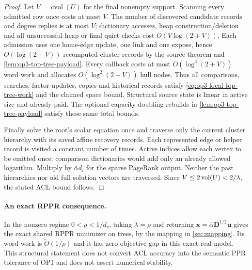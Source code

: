 \begin{proof}
Let $V=\operatorname{cvol}(U)$ for the final nonempty support. Scanning every
admitted row once costs at most $V$. The number of discovered candidate
records and degree replies is at most $V$; dictionary accesses, heap
construction/deletion and all unsuccessful heap or final quiet checks cost
$O(V\log(2+V))$. Each admission uses one home-edge update, one link and one
expose, hence $O(\log(2+V))$ recomputed cluster records by the source theorem
and \cref{lem:op3-top-tree-payload}. Every callback costs at most
$O(\log^3(2+V))$ word work and allocates $O(\log^2(2+V))$ hull nodes.
Thus all comparisons, searches, factor updates, copies and historical
records satisfy \eqref{eq:op3-local-top-tree-work} and the claimed space
bound. Structural source state is linear in active size and already paid.
The optional capacity-doubling rebuilds in
\cref{lem:op3-top-tree-payload} satisfy these same total bounds.

Finally solve the root's scalar equation once and traverse only the current
cluster hierarchy with its saved affine recovery records. Each represented
edge or helper record is visited a constant number of times. Active indices
allow each vertex to be emitted once; comparison dictionaries would add only
an already allowed logarithm. Multiply by $\bar\alpha d_i$ for the sparse
PageRank output. Neither the past hierarchies nor old full solution vectors
are traversed. Since $V\leq2\operatorname{vol}(U)<2/\lambda$, the stated ACL bound follows.
\end{proof}

\paragraph{An exact RPPR consequence.}
In the nonzero regime $0<\rho<1/d_v$, taking $\lambda=\rho$ and returning
$\boldsymbol x=\bar\alpha\boldsymbol D^{1/2}\boldsymbol u$ gives the exact
shared RPPR minimizer on trees, by the mapping in \cref{sec:mapping}.
Its word work is $\widetilde O(1/\rho)$ and it has zero objective gap in this
exact-real model. This structural statement does not convert ACL accuracy
into the semantic PPR tolerance of OP1 and does not assert numerical stability.

